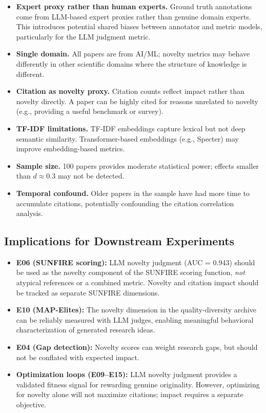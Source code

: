 \documentclass[11pt,a4paper]{article}
\begin{document}
\begin{itemize}
  \item \textbf{Expert proxy rather than human experts.}  Ground truth
    annotations come from LLM-based expert proxies rather than genuine
    domain experts.  This introduces potential shared biases between
    annotator and metric models, particularly for the LLM judgment
    metric.
  \item \textbf{Single domain.}  All papers are from AI/ML; novelty
    metrics may behave differently in other scientific domains where
    the structure of knowledge is different.
  \item \textbf{Citation as novelty proxy.}  Citation counts reflect
    impact rather than novelty directly.  A paper can be highly cited
    for reasons unrelated to novelty (e.g., providing a useful
    benchmark or survey).
  \item \textbf{TF-IDF limitations.}  TF-IDF embeddings capture lexical
    but not deep semantic similarity.  Transformer-based embeddings
    (e.g., Specter) may improve embedding-based metrics.
  \item \textbf{Sample size.}  100 papers provides moderate statistical
    power; effects smaller than $d \approx 0.3$ may not be detected.
  \item \textbf{Temporal confound.}  Older papers in the sample have had
    more time to accumulate citations, potentially confounding the
    citation correlation analysis.
\end{itemize}

\subsection{Implications for Downstream Experiments}

\begin{itemize}
  \item \textbf{E06 (SUNFIRE scoring):}  LLM novelty judgment
    (AUC = 0.943) should be used as the novelty component of the SUNFIRE
    scoring function, \emph{not} atypical references or a combined
    metric.  Novelty and citation impact should be tracked as separate
    SUNFIRE dimensions.
  \item \textbf{E10 (MAP-Elites):}  The novelty dimension in the
    quality-diversity archive can be reliably measured with LLM judges,
    enabling meaningful behavioral characterization of generated
    research ideas.
  \item \textbf{E04 (Gap detection):}  Novelty scores can weight
    research gaps, but should not be conflated with expected impact.
  \item \textbf{Optimization loops (E09--E15):}  LLM novelty judgment
    provides a validated fitness signal for rewarding genuine
    originality.  However, optimizing for novelty alone will not
    maximize citations; impact requires a separate objective.
\end{itemize}
\end{document}
